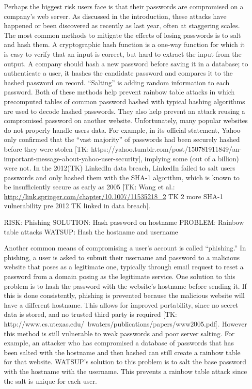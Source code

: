 Perhaps the biggest risk users face is that their passwords are compromised on a company’s web server. As discussed in the introduction, these attacks have happened or been discovered as recently as last year, often at staggering scales. The most common methods to mitigate the effects of losing passwords is to salt and hash them. A cryptographic hash function is a one-way function for which it is easy to verify that an input is correct, but hard to extract the input from the output. A company should hash a new password before saving it in a database; to authenticate a user, it hashes the candidate password and compares it to the hashed password on record. “Salting” is adding random information to each password. Both of these methods help prevent rainbow table attacks in which precomputed tables of common password hashed with typical hashing algorithms are used to decode hashed passwords. They also help prevent an attack reusing a compromised password on another website. Unfortunately, many popular websites do not properly handle users data. For example, in its official statement, Yahoo only confirmed that the “vast majority” of passwords had been securely hashed before they were stolen [TK: https://yahoo.tumblr.com/post/150781911849/an-important-message-about-yahoo-user-security], implying some (out of a billion) were not. In the 2012(TK) LinkedIn data breach, LinkedIn failed to  salt users passwords and only hashed them with the SHA-1 algorithm, which is known to be insufficiently secure as early as 2005 [TK: Wang et al.: \url{http://link.springer.com/chapter/10.1007/11535218_2} TK 2 more SHA-1 vulnerability pre 2012 TK linked in data breach].


RISK: Phishing
SOLUTION: Hash password on hostname
PROBLEM: Rainbow table attacks
WATSUP: Hash the hostname and username

Another common means of compromising a user’s account is called “phishing.” In phishing, a user is asked to submit their username and password to a malicious website that poses as a legitimate one, typically through email request to reset a password from a domain posing as the legitimate service. One solution to this problem is to hash the password with the website’s hostname before sending it. If this is done consistently, phishing is prevented because the malicious website will have a different hostname. This allows for improved portability, since no secret data is stored, and no trusted third party is required [TK: http://www.cs.utexas.edu/~bwaters/publications/papers/www2005.pdf]. However this method is still vulnerable to weak passwords and poor server salting. For example, an attacker who has compromised a database of passwords that has been salted with the hostname and then hashed can still create a rainbow table for that website. WATSUP’s solution to this problem is to salt the base password with the hostname with the username. This prevents a rainbow table attack since the salt is unique for each user.


